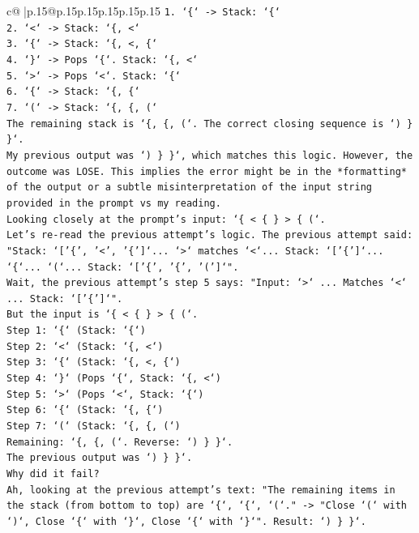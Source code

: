 \documentclass{article}
\begin{document}
{\begin{supertabular}{c@{$\;$}|p{.15\linewidth}@{}p{.15\linewidth}p{.15\linewidth}p{.15\linewidth}p{.15\linewidth}p{.15\linewidth}}
{{{\texttt{1. `\{` {-}> Stack: `\{`} \\
\texttt{2. `<` {-}> Stack: `\{, <`} \\
\texttt{3. `\{` {-}> Stack: `\{, <, \{`} \\
\texttt{4. `\}` {-}> Pops `\{`. Stack: `\{, <`} \\
\texttt{5. `>` {-}> Pops `<`. Stack: `\{`} \\
\texttt{6. `\{` {-}> Stack: `\{, \{`} \\
\texttt{7. `(` {-}> Stack: `\{, \{, (`} \\
\texttt{The remaining stack is `\{, \{, (`. The correct closing sequence is `) \} \}`.} \\
\texttt{My previous output was `) \} \}`, which matches this logic. However, the outcome was LOSE. This implies the error might be in the *formatting* of the output or a subtle misinterpretation of the input string provided in the prompt vs my reading.} \\
\texttt{Looking closely at the prompt's input: `\{ < \{ \} > \{ (`.} \\
\texttt{Let's re{-}read the previous attempt's logic. The previous attempt said: "Stack: `{[}'\{', '<', '\{'{]}`... `>` matches `<`... Stack: `{[}'\{'{]}`... `\{`... `(`... Stack: `{[}'\{', '\{', '('{]}`".} \\
\texttt{Wait, the previous attempt's step 5 says: "Input: `>` ... Matches `<` ... Stack: `{[}'\{'{]}`".} \\
\texttt{But the input is `\{ < \{ \} > \{ (`.} \\
\texttt{Step 1: `\{` (Stack: `\{`)} \\
\texttt{Step 2: `<` (Stack: `\{, <`)} \\
\texttt{Step 3: `\{` (Stack: `\{, <, \{`)} \\
\texttt{Step 4: `\}` (Pops `\{`, Stack: `\{, <`)} \\
\texttt{Step 5: `>` (Pops `<`, Stack: `\{`)} \\
\texttt{Step 6: `\{` (Stack: `\{, \{`)} \\
\texttt{Step 7: `(` (Stack: `\{, \{, (`)} \\
\texttt{Remaining: `\{, \{, (`. Reverse: `) \} \}`.} \\
\texttt{The previous output was `) \} \}`.} \\
\texttt{Why did it fail?} \\
\texttt{Ah, looking at the previous attempt's text: "The remaining items in the stack (from bottom to top) are `\{`, `\{`, `(`." {-}> "Close `(` with `)`, Close `\{` with `\}`, Close `\{` with `\}`". Result: `) \} \}`.} \\
}}}
\end{supertabular}}
\end{document}
